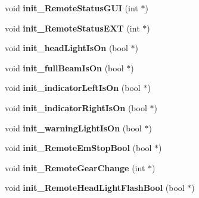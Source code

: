 \begin{DoxyCompactItemize}
\item 
\hypertarget{class_remote_thread_ae376c77e15ff8adb7b60028ad92547bb}{}void {\bfseries init\+\_\+\+Remote\+Status\+G\+U\+I} (int $\ast$)\label{class_remote_thread_ae376c77e15ff8adb7b60028ad92547bb}

\item 
\hypertarget{class_remote_thread_ad69aba3296b67a50b8dff3c22f7e89a0}{}void {\bfseries init\+\_\+\+Remote\+Status\+E\+X\+T} (int $\ast$)\label{class_remote_thread_ad69aba3296b67a50b8dff3c22f7e89a0}

\item 
\hypertarget{class_remote_thread_a659f51b16da9cdb8caf52f0c885d2be6}{}void {\bfseries init\+\_\+head\+Light\+Is\+On} (bool $\ast$)\label{class_remote_thread_a659f51b16da9cdb8caf52f0c885d2be6}

\item 
\hypertarget{class_remote_thread_a6d1ea3bd7e4a7ff4c2e0665699bae8f9}{}void {\bfseries init\+\_\+full\+Beam\+Is\+On} (bool $\ast$)\label{class_remote_thread_a6d1ea3bd7e4a7ff4c2e0665699bae8f9}

\item 
\hypertarget{class_remote_thread_a3b2cadf9a68f30c60520ec7b4ef2dcce}{}void {\bfseries init\+\_\+indicator\+Left\+Is\+On} (bool $\ast$)\label{class_remote_thread_a3b2cadf9a68f30c60520ec7b4ef2dcce}

\item 
\hypertarget{class_remote_thread_a254eceb6b4f4089e7b102abdb420af6d}{}void {\bfseries init\+\_\+indicator\+Right\+Is\+On} (bool $\ast$)\label{class_remote_thread_a254eceb6b4f4089e7b102abdb420af6d}

\item 
\hypertarget{class_remote_thread_ac925727df6675d74636db3ee90fb2717}{}void {\bfseries init\+\_\+warning\+Light\+Is\+On} (bool $\ast$)\label{class_remote_thread_ac925727df6675d74636db3ee90fb2717}

\item 
\hypertarget{class_remote_thread_af15651120a1ed1a43d54fe0b562a68c9}{}void {\bfseries init\+\_\+\+Remote\+Em\+Stop\+Bool} (bool $\ast$)\label{class_remote_thread_af15651120a1ed1a43d54fe0b562a68c9}

\item 
\hypertarget{class_remote_thread_afbfe2a847389c2633f3c1f5b3ef282dc}{}void {\bfseries init\+\_\+\+Remote\+Gear\+Change} (int $\ast$)\label{class_remote_thread_afbfe2a847389c2633f3c1f5b3ef282dc}

\item 
\hypertarget{class_remote_thread_a996adb972df55c57ef020e199a2edc80}{}void {\bfseries init\+\_\+\+Remote\+Head\+Light\+Flash\+Bool} (bool $\ast$)\label{class_remote_thread_a996adb972df55c57ef020e199a2edc80}


\end{DoxyCompactItemize}
